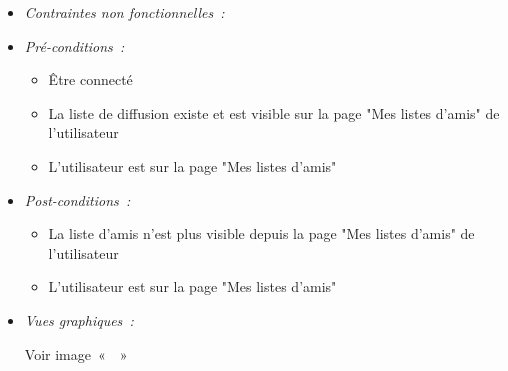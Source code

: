 \begin{itemize}
\item \textit{Contraintes non fonctionnelles~:}

\item \textit{Pré-conditions~:}

    \begin{itemize}
        \item Être connecté
        \item La liste de diffusion existe et est visible sur la page "Mes listes d'amis" de l'utilisateur
        \item L'utilisateur est sur la page "Mes listes d'amis"
    \end{itemize}

\item \textit{Post-conditions~:}
    \begin{itemize}
        \item La liste d'amis n'est plus visible depuis la page "Mes listes d'amis" de l'utilisateur        \item L'utilisateur est sur la page "Mes listes d'amis"
    \end{itemize}
    
    \item \textit{Vues graphiques~:}
    
    Voir image~«~~»


\end{itemize}




    
    
    
    
    
